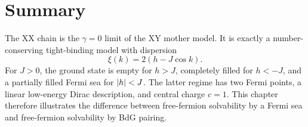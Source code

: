 \section{Summary}
\label{sec:xx-summary}

The XX chain is the $\gamma=0$ limit of the XY mother model.  It is exactly a
number-conserving tight-binding model with dispersion
\begin{equation}
    \xi(k)=2(h-J\cos k).
\end{equation}
For $J>0$, the ground state is empty for $h>J$, completely filled for $h<-J$,
and a partially filled Fermi sea for $\left|h\right|<J$.  The latter regime has two
Fermi points, a linear low-energy Dirac description, and central charge $c=1$.
This chapter therefore illustrates the difference between free-fermion
solvability by a Fermi sea and free-fermion solvability by BdG pairing.
